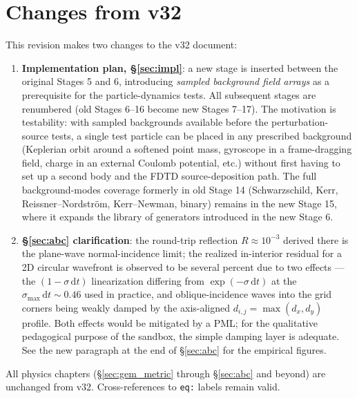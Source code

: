 \documentclass[11pt,a4paper]{article}
\newcommand{\dd}{\mathrm{d}}
\begin{document}
\section*{Changes from v32}

This revision makes two changes to the v32 document:

\begin{enumerate}
  \item \textbf{Implementation plan, §\ref{sec:impl}}: a new stage is inserted between the original Stages 5 and 6, introducing \emph{sampled background field arrays} as a prerequisite for the particle-dynamics tests.  All subsequent stages are renumbered (old Stages 6--16 become new Stages 7--17).  The motivation is testability: with sampled backgrounds available before the perturbation-source tests, a single test particle can be placed in any prescribed background (Keplerian orbit around a softened point mass, gyroscope in a frame-dragging field, charge in an external Coulomb potential, etc.) without first having to set up a second body and the FDTD source-deposition path.  The full background-modes coverage formerly in old Stage 14 (Schwarzschild, Kerr, Reissner--Nordstr\"om, Kerr--Newman, binary) remains in the new Stage 15, where it expands the library of generators introduced in the new Stage 6.
  \item \textbf{§\ref{sec:abc} clarification}: the round-trip reflection $R\approx10^{-3}$ derived there is the plane-wave normal-incidence limit; the realized in-interior residual for a 2D circular wavefront is observed to be several percent due to two effects --- the $(1-\sigma\,\dd t)$ linearization differing from $\exp(-\sigma\,\dd t)$ at the $\sigma_{\max}\,\dd t\sim0.46$ used in practice, and oblique-incidence waves into the grid corners being weakly damped by the axis-aligned $d_{i,j}=\max(d_x,d_y)$ profile.  Both effects would be mitigated by a PML; for the qualitative pedagogical purpose of the sandbox, the simple damping layer is adequate.  See the new paragraph at the end of §\ref{sec:abc} for the empirical figures.
\end{enumerate}

All physics chapters (§\ref{sec:gem_metric} through §\ref{sec:abc} and beyond) are unchanged from v32.  Cross-references to \texttt{eq:} labels remain valid.

\newpage

\end{document}
